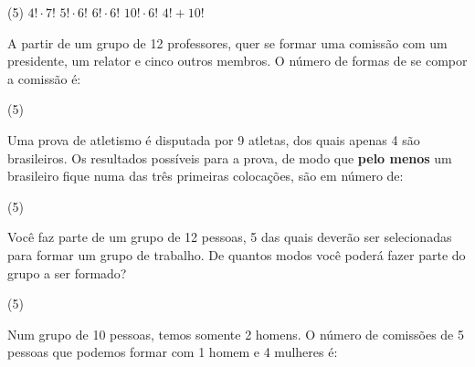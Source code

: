 \documentclass[10pt,a4paper]{article}
\begin{document}
\begin{multicols}{2}
\begin{question}[type=exam]
        \begin{tasks}(5)
            \task $4! \cdot 7!$
            \task $5! \cdot 6!$
            \task $6! \cdot 6!$
            \task $10! \cdot 6!$
            \task $4!+10!$
        \end{tasks}
    \end{question}

    \begin{question}[type=exam]
        A partir de um grupo de 12 professores, quer se formar uma comissão com
        um presidente, um relator e cinco outros membros. O número de formas
        de se compor a comissão é:

        \begin{tasks}(5)
        \end{tasks}
    \end{question}

    \begin{question}[type=exam]
        Uma prova de atletismo é disputada por 9 atletas, dos quais apenas 4 são
        brasileiros. Os resultados possíveis para a prova, de modo que \textbf{pelo menos}
        um brasileiro fique numa das três primeiras colocações, são em número de:

        \begin{tasks}(5)
        \end{tasks}
    \end{question}

    \begin{question}[type=exam]
        Você faz parte de um grupo de 12 pessoas, 5 das quais deverão ser selecionadas
        para formar um grupo de trabalho. De quantos modos você poderá fazer parte do grupo
        a ser formado?

        \begin{tasks}(5)
        \end{tasks}

    \end{question}

    \begin{question}[type=exam]
        Num grupo de 10 pessoas, temos somente 2 homens. O número de comissões
        de 5 pessoas que podemos formar com 1 homem e 4 mulheres é:


\end{question}
\end{multicols}
\end{document}
